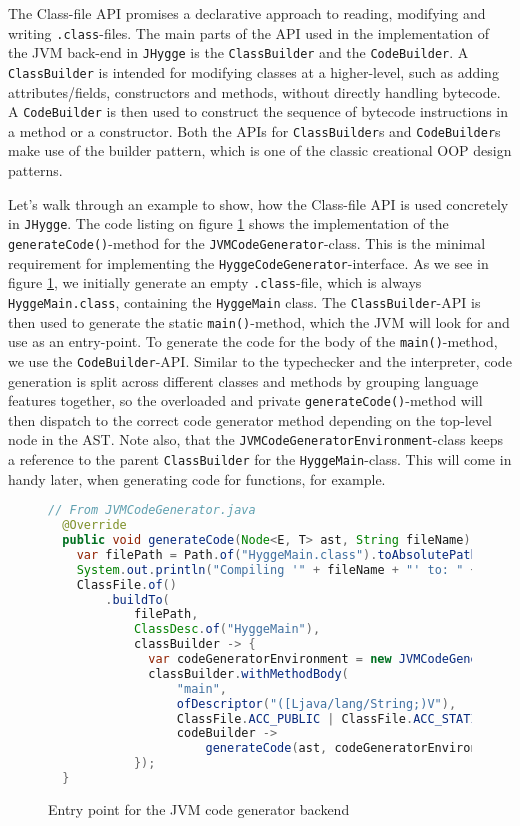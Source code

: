 The Class-file API\cite{jep484} promises a declarative approach to reading, modifying and writing \texttt{.class}-files. The main parts of the
API used in the implementation of the JVM back-end in \texttt{JHygge} is the \texttt{ClassBuilder}\cite{java_classbuilder} and the \texttt{CodeBuilder}\cite{java_codebuilder}.
A \texttt{ClassBuilder} is intended for modifying classes at a higher-level, such as adding attributes/fields, constructors and methods,
without directly handling bytecode. A \texttt{CodeBuilder} is then used to construct the sequence of bytecode instructions in
a method or a constructor. Both the APIs for \texttt{ClassBuilder}s and \texttt{CodeBuilder}s make use of the builder pattern, which is one of the
classic creational OOP design patterns\cite{gof}.

Let's walk through an example to show, how the Class-file API is used concretely in \texttt{JHygge}. The code listing on figure \ref{fig:codegen_main} shows
the implementation of the \texttt{generateCode()}-method for the \texttt{JVMCodeGenerator}-class. This is the minimal requirement
for implementing the \texttt{HyggeCodeGenerator}-interface. As we see in figure \ref{fig:codegen_main}, we initially generate an empty \texttt{.class}-file,
which is always \texttt{HyggeMain.class}, containing the \texttt{HyggeMain} class. The \texttt{ClassBuilder}-API is then used to
generate the static \texttt{main()}-method, which the JVM will look for and use as an entry-point. To generate the code for
the body of the \texttt{main()}-method, we use the \texttt{CodeBuilder}-API. Similar to the typechecker and the interpreter,
code generation is split across different classes and methods by grouping language features together, so the overloaded and private
\texttt{generateCode()}-method will then dispatch to the correct code generator method depending on the top-level node in the AST.
Note also, that the \texttt{JVMCodeGeneratorEnvironment}-class keeps a reference to the parent \texttt{ClassBuilder} for the
\texttt{HyggeMain}-class. This will come in handy later, when generating code for functions, for example.

\begin{figure}[H]
\centering 
\begin{lstlisting}[language=Java]
  // From JVMCodeGenerator.java
  @Override
  public void generateCode(Node<E, T> ast, String fileName) throws IOException {
    var filePath = Path.of("HyggeMain.class").toAbsolutePath();
    System.out.println("Compiling '" + fileName + "' to: " + filePath);
    ClassFile.of()
        .buildTo(
            filePath,
            ClassDesc.of("HyggeMain"),
            classBuilder -> {
              var codeGeneratorEnvironment = new JVMCodeGeneratorEnvironment(classBuilder);
              classBuilder.withMethodBody(
                  "main",
                  ofDescriptor("([Ljava/lang/String;)V"),
                  ClassFile.ACC_PUBLIC | ClassFile.ACC_STATIC,
                  codeBuilder ->
                      generateCode(ast, codeGeneratorEnvironment, codeBuilder).return_());
            });
  }
\end{lstlisting}
\caption{Entry point for the JVM code generator backend}
\label{fig:codegen_main}
\end{figure}

